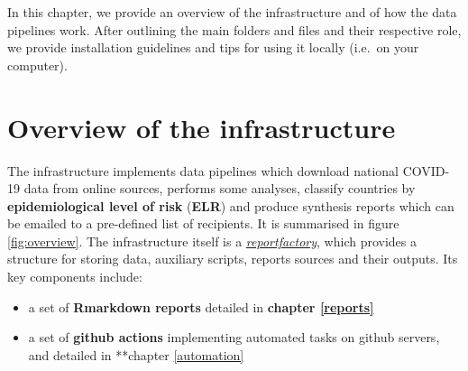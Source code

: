 \documentclass[]{book}
\providecommand{\tightlist}{%
  \setlength{\itemsep}{0pt}\setlength{\parskip}{0pt}}
\begin{document}
In this chapter, we provide an overview of the infrastructure and of how the
data pipelines work. After outlining the main folders and files and their
respective role, we provide installation guidelines and tips for using it
locally (i.e.~on your computer).

\hypertarget{overview-of-the-infrastructure}{%
\section{Overview of the infrastructure}\label{overview-of-the-infrastructure}}

The infrastructure implements data pipelines which download national COVID-19
data from online sources, performs some analyses, classify countries by
\textbf{epidemiological level of risk} (\textbf{ELR}) and produce synthesis reports which
can be emailed to a pre-defined list of recipients. It is summarised in figure
\ref{fig:overview}. The infrastructure itself is a
\href{https://www.reconverse.org/reportfactory/}{\emph{reportfactory}}, which provides a
structure for storing data, auxiliary scripts, reports sources and their
outputs. Its key components include:

\begin{itemize}
\tightlist
\item
  a set of \textbf{Rmarkdown reports} detailed in \textbf{chapter \ref{reports}}
\item
  a set of \textbf{github actions} implementing automated tasks on github servers, and
  detailed in **chapter \ref{automation}
\end{itemize}
\end{document}

